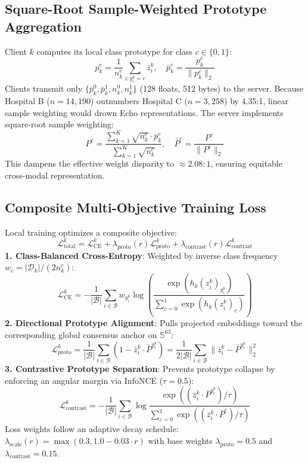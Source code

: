 \documentclass[conference]{IEEEtran}
\begin{document}
\subsection{Square-Root Sample-Weighted Prototype Aggregation}
Client $k$ computes its local class prototype for class $c \in \{0, 1\}$:
\begin{equation}
    p_k^c = \frac{1}{n_k^c} \sum_{i: y_i^k = c} \bar{z}_i^k, \quad \bar{p}_k^c = \frac{p_k^c}{\|p_k^c\|_2}
\end{equation}
Clients transmit only $\{\bar{p}_k^0, \bar{p}_k^1, n_k^0, n_k^1\}$ (128 floats, 512 bytes) to the server. Because Hospital B ($n=14,190$) outnumbers Hospital C ($n=3,258$) by 4.35:1, linear sample weighting would drown Echo representations. The server implements square-root sample weighting:
\begin{equation}
    P^c = \frac{\sum_{k=1}^K \sqrt{n_k^c} \cdot \bar{p}_k^c}{\sum_{k=1}^K \sqrt{n_k^c}}, \quad \bar{P}^c = \frac{P^c}{\|P^c\|_2}
\end{equation}
This dampens the effective weight disparity to $\approx 2.08:1$, ensuring equitable cross-modal representation.

\subsection{Composite Multi-Objective Training Loss}
Local training optimizes a composite objective:
\begin{equation}
    \mathcal{L}_{\text{total}}^k = \mathcal{L}_{\text{CE}}^k + \lambda_{\text{proto}}(r) \mathcal{L}_{\text{proto}}^k + \lambda_{\text{contrast}}(r) \mathcal{L}_{\text{contrast}}^k
\end{equation}
\textbf{1. Class-Balanced Cross-Entropy}: Weighted by inverse class frequency $w_c = |\mathcal{D}_k| / (2 n_k^c)$:
\begin{equation}
    \mathcal{L}_{\text{CE}}^k = - \frac{1}{|\mathcal{B}|} \sum_{i \in \mathcal{B}} w_{y_i^k} \log \left( \frac{\exp(h_k(z_i^k)_{y_i^k})}{\sum_{c=0}^1 \exp(h_k(z_i^k)_c)} \right)
\end{equation}
\textbf{2. Directional Prototype Alignment}: Pulls projected embeddings toward the corresponding global consensus anchor on $\mathbb{S}^{63}$:
\begin{equation}
    \mathcal{L}_{\text{proto}}^k = \frac{1}{|\mathcal{B}|} \sum_{i \in \mathcal{B}} (1 - \bar{z}_i^k \cdot \bar{P}^{y_i^k}) = \frac{1}{2|\mathcal{B}|} \sum_{i \in \mathcal{B}} \|\bar{z}_i^k - \bar{P}^{y_i^k}\|_2^2
\end{equation}
\textbf{3. Contrastive Prototype Separation}: Prevents prototype collapse by enforcing an angular margin via InfoNCE ($\tau=0.5$):
\begin{equation}
    \mathcal{L}_{\text{contrast}}^k = - \frac{1}{|\mathcal{B}|} \sum_{i \in \mathcal{B}} \log \frac{\exp((\bar{z}_i^k \cdot \bar{P}^{y_i^k}) / \tau)}{\sum_{c=0}^1 \exp((\bar{z}_i^k \cdot \bar{P}^c) / \tau)}
\end{equation}
Loss weights follow an adaptive decay schedule: $\lambda_{\text{scale}}(r) = \max(0.3, 1.0 - 0.03 \cdot r)$ with base weights $\lambda_{\text{proto}}=0.5$ and $\lambda_{\text{contrast}}=0.15$.
\end{document}
